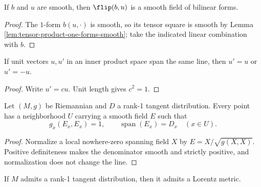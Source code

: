 \begin{lemma}
\label{lem:sign-flipped-form-smooth}
\leanok
{}
If $b$ and $u$ are smooth, then $\flip(b,u)$ is a smooth field of bilinear forms.
\end{lemma}

\begin{proof}
\leanok
{}
\sketch The $1$-form $b(u,\cdot)$ is smooth, so its tensor square is smooth by
Lemma \ref{lem:tensor-product-one-forms-smooth}; take the indicated linear
combination with $b$.
\end{proof}

\begin{lemma}
\label{lem:two-unit-vectors-of-a-line}
\leanok
If unit vectors $u,u'$ in an inner product space span the same line, then
$u'=u$ or $u'=-u$.
\end{lemma}

\begin{proof}
\leanok
\sketch Write $u'=cu$. Unit length gives $c^2=1$.
\end{proof}

\begin{lemma}
\label{lem:local-unit-section}
\leanok
{}
Let $(M,g)$ be Riemannian and $D$ a rank-1 tangent distribution. Every point has
a neighborhood $U$ carrying a smooth field $E$ such that
\[
g_x(E_x,E_x)=1,
\qquad\operatorname{span}(E_x)=D_x
\quad(x\in U).
\]
\end{lemma}

\begin{proof}
\leanok
{}
\sketch Normalize a local nowhere-zero spanning field $X$ by
$E=X/\sqrt{g(X,X)}$. Positive definiteness makes the denominator smooth and
strictly positive, and normalization does not change the line.
\end{proof}

\begin{proposition}
\label{prop:lorentz-metric-of-rank-one-distribution}
\leanok
{}
If $M$ admits a rank-1 tangent distribution, then it admits a Lorentz metric.
\end{proposition}


